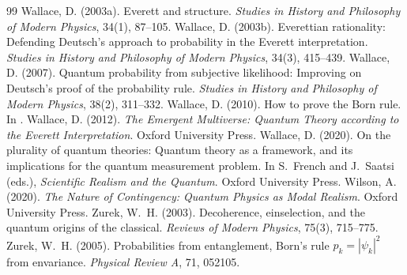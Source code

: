 \documentclass{situationist-preprint}
\begin{document}
\begin{thebibliography}{99}
 Wallace, D. (2003a). Everett and structure. \emph{Studies in History and Philosophy of Modern Physics}, 34(1), 87--105.
 Wallace, D. (2003b). Everettian rationality: Defending Deutsch's approach to probability in the Everett interpretation. \emph{Studies in History and Philosophy of Modern Physics}, 34(3), 415--439.
 Wallace, D. (2007). Quantum probability from subjective likelihood: Improving on Deutsch's proof of the probability rule. \emph{Studies in History and Philosophy of Modern Physics}, 38(2), 311--332.
 Wallace, D. (2010). How to prove the Born rule. In \citet{Saunders2010}.
 Wallace, D. (2012). \emph{The Emergent Multiverse: Quantum Theory according to the Everett Interpretation}. Oxford University Press.
 Wallace, D. (2020). On the plurality of quantum theories: Quantum theory as a framework, and its implications for the quantum measurement problem. In S.~French and J.~Saatsi (eds.), \emph{Scientific Realism and the Quantum}. Oxford University Press.
 Wilson, A. (2020). \emph{The Nature of Contingency: Quantum Physics as Modal Realism}. Oxford University Press.
 Zurek, W.~H. (2003). Decoherence, einselection, and the quantum origins of the classical. \emph{Reviews of Modern Physics}, 75(3), 715--775.
 Zurek, W.~H. (2005). Probabilities from entanglement, Born's rule $p_k=|\psi_k|^2$ from envariance. \emph{Physical Review A}, 71, 052105.
\end{thebibliography}
\end{document}
